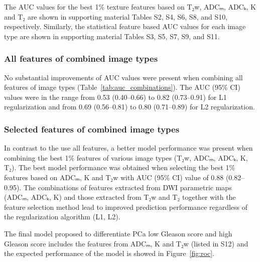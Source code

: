 The AUC values for the best 1\% texture features based on T₂w, ADCₘ, ADCₖ, K
and T₂ are shown in supporting material Tables S2, S4, S6, S8, and S10,
respectively. Similarly, the statistical feature based AUC values for each image
type are shown in supporting material Tables S3, S5, S7, S9, and S11.


\subsubsection{All features of combined image types}

No substantial improvements of AUC values were present when combining all
features of image types (Table~\ref{tab:auc_combinations}). The AUC (95\% CI)
values were in the range from 0.53 (0.40--0.66) to 0.82 (0.73--0.91) for L1
regularization and from 0.69 (0.56--0.81) to 0.80 (0.71--0.89) for L2
regularization.


\subsubsection{Selected features of combined image types}

In contrast to the use all features, a better model performance was present when
combining the best 1\% features of various image types (T₂w, ADCₘ, ADCₖ, K,
T₂). The best model performance was obtained when selecting the best 1\%
features based on ADCₘ, K and T₂w with AUC (95\% CI) value of 0.88
(0.82--0.95). The combinations of features extracted from DWI parametric maps
(ADCₘ, ADCₖ, K) and those extracted from T₂w and T₂ together with the
feature selection method lead to improved prediction performance regardless of
the regularization algorithm (L1, L2).

The final model proposed to differentiate PCa low Gleason score and high Gleason
score includes the features from ADCₘ, K and T₂w (listed in S12) and the
expected performance of the model is showed in Figure~\ref{fig:roc}.
